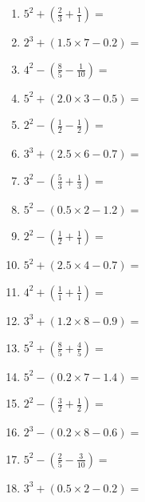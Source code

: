 \documentclass[12pt]{article}
\begin{document}
\begin{enumerate}
\item \large $ 5^{2} + (\frac{2}{3} + \frac{1}{1}) = $ \vspace{1.6cm}
\item \large $ 2^{3} + (1.5 \times 7 - 0.2) = $ \vspace{1.6cm}
\item \large $ 4^{2} - (\frac{8}{5} - \frac{1}{10}) = $ \vspace{1.6cm}
\item \large $ 5^{2} + (2.0 \times 3 - 0.5) = $ \vspace{1.6cm}
\newpage
\item \large $ 2^{2} - (\frac{1}{2} - \frac{1}{2}) = $ \vspace{1.6cm}
\item \large $ 3^{3} + (2.5 \times 6 - 0.7) = $ \vspace{1.6cm}
\item \large $ 3^{2} - (\frac{5}{3} + \frac{1}{3}) = $ \vspace{1.6cm}
\item \large $ 5^{2} - (0.5 \times 2 - 1.2) = $ \vspace{1.6cm}
\item \large $ 2^{2} - (\frac{1}{2} + \frac{1}{1}) = $ \vspace{1.6cm}
\item \large $ 5^{2} + (2.5 \times 4 - 0.7) = $ \vspace{1.6cm}
\item \large $ 4^{2} + (\frac{1}{1} + \frac{1}{1}) = $ \vspace{1.6cm}
\item \large $ 3^{3} + (1.2 \times 8 - 0.9) = $ \vspace{1.6cm}
\item \large $ 5^{2} + (\frac{8}{5} + \frac{4}{5}) = $ \vspace{1.6cm}
\item \large $ 5^{2} - (0.2 \times 7 - 1.4) = $ \vspace{1.6cm}
\newpage
\item \large $ 2^{2} - (\frac{3}{2} + \frac{1}{2}) = $ \vspace{1.6cm}
\item \large $ 2^{3} - (0.2 \times 8 - 0.6) = $ \vspace{1.6cm}
\item \large $ 5^{2} - (\frac{2}{5} - \frac{3}{10}) = $ \vspace{1.6cm}
\item \large $ 3^{3} + (0.5 \times 2 - 0.2) = $ \vspace{1.6cm}

\end{enumerate}
\end{document}
